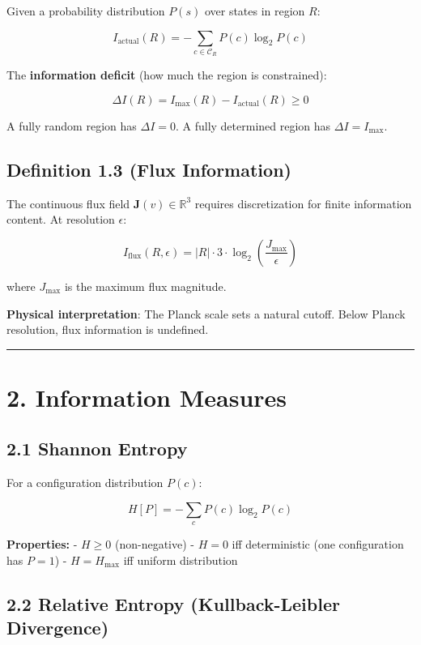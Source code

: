 \documentclass[
  11pt,
  letterpaper,
  twoside,
  openright]{book}
\begin{document}
Given a probability distribution \(P(s)\) over states in region \(R\):

\[I_{\text{actual}}(R) = -\sum_{c \in \mathcal{C}_R} P(c) \log_2 P(c)\]

The \textbf{information deficit} (how much the region is constrained):

\[\Delta I(R) = I_{\text{max}}(R) - I_{\text{actual}}(R) \geq 0\]

A fully random region has \(\Delta I = 0\). A fully determined region
has \(\Delta I = I_{\text{max}}\).

\subsection{Definition 1.3 (Flux
Information)}\label{definition-1.3-flux-information}

The continuous flux field \(\mathbf{J}(v) \in \mathbb{R}^3\) requires
discretization for finite information content. At resolution
\(\epsilon\):

\[I_{\text{flux}}(R, \epsilon) = |R| \cdot 3 \cdot \log_2\left(\frac{J_{\text{max}}}{\epsilon}\right)\]

where \(J_{\text{max}}\) is the maximum flux magnitude.

\textbf{Physical interpretation}: The Planck scale sets a natural
cutoff. Below Planck resolution, flux information is undefined.

\begin{center}\rule{0.5\linewidth}{0.5pt}\end{center}

\section{2. Information Measures}\label{information-measures}

\subsection{2.1 Shannon Entropy}\label{shannon-entropy-2}

For a configuration distribution \(P(c)\):

\[H[P] = -\sum_c P(c) \log_2 P(c)\]

\textbf{Properties:} - \(H \geq 0\) (non-negative) - \(H = 0\) iff
deterministic (one configuration has \(P = 1\)) - \(H = H_{\text{max}}\)
iff uniform distribution

\subsection{2.2 Relative Entropy (Kullback-Leibler
Divergence)}\label{relative-entropy-kullback-leibler-divergence}
\end{document}

